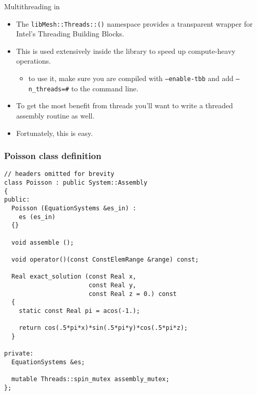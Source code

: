 \frame
{
  \Large
  \begin{block}{}
  \end{block}
}

\begin{frame}
  \begin{block}{Multithreading in \libMesh{}}
    \begin{itemize}
    \item The \texttt{libMesh::Threads::()} namespace provides a transparent wrapper for Intel's Threading Building Blocks.
    \item This is used extensively inside the library to speed up compute-heavy operations.
      \begin{itemize}
        \item to use it, make sure you are compiled with \texttt{--enable-tbb} and add \texttt{--n\_threads=\#} to the command line.
      \end{itemize}
      \item To get the most benefit from threads you'll want to write a threaded assembly routine as well.
      \item Fortunately, this is easy.
    \end{itemize}
  \end{block}
\end{frame}


\begin{frame}
  \frametitle{Poisson class definition}

  \begin{lstlisting}
// headers omitted for brevity
class Poisson : public System::Assembly
{
public:
  Poisson (EquationSystems &es_in) :
    es (es_in)
  {}

  void assemble ();

  void operator()(const ConstElemRange &range) const;

  Real exact_solution (const Real x,
                       const Real y,
                       const Real z = 0.) const
  {
    static const Real pi = acos(-1.);

    return cos(.5*pi*x)*sin(.5*pi*y)*cos(.5*pi*z);
  }

private:
  EquationSystems &es;

  mutable Threads::spin_mutex assembly_mutex;
};
  \end{lstlisting}
\end{frame}




